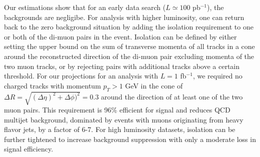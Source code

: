 \documentclass[aps,prl,nofootinbib,superscriptaddress]{revtex4}
\begin{document}
Our estimations show that for an early data search ($L\simeq100$ pb$^{-1}$), the backgrounds are negligibe.
For analysis with higher luminosity, one can return back to the zero background situation by adding the 
isolation requirement to one or both of the di-muon pairs in the event. Isolation can be defined by 
either setting the upper bound on the sum of transverse momenta of all tracks in a cone around the 
reconstructed direction of the di-muon pair excluding momenta of the two muon tracks, or by rejecting pairs 
with additional tracks above a certain threshold. For our projections for an analysis with $L=1$ fb$^{-1}$, 
we required no charged tracks with momentum $p_T>1$ GeV in the cone of $\Delta R = \sqrt{(\Delta \eta)^2+\Delta \phi)^2}=0.3$ 
around the direction of at least one of the two muon pairs. This requirement is 96\% efficient for signal and 
reduces QCD multijet background, dominated by events with muons originating from heavy flavor 
jets, by a factor of 6-7. For high luminosity datasets, isolation can be further tightened to 
increase background suppression with only a moderate loss in signal efficiency.

\begin{table}[t]
\caption{Expected rate of background events per 100 $\ipb$ of luminosity after the selection cuts.\label{bckgr_cuts_number_reco_level}}
\begin{center}
\end{center}
\end{table}
\end{document}
